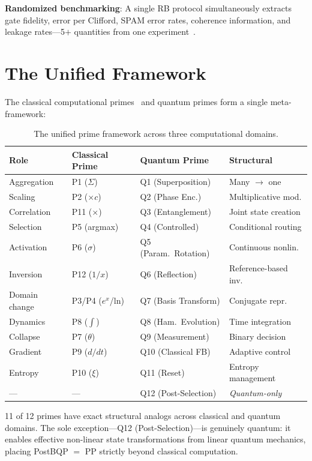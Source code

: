 \documentclass[11pt]{article}
\begin{document}
\textbf{Randomized benchmarking}: A single RB protocol simultaneously extracts gate fidelity, error per Clifford, SPAM error rates, coherence information, and leakage rates---5$+$ quantities from one experiment~\cite{rb}.

\section{The Unified Framework}
\label{sec:unified}

The classical computational primes~\cite{bieg_primes} and quantum primes form a single meta-framework:

\begin{table}[h]
\centering
\caption{The unified prime framework across three computational domains.}
\label{tab:unified}
\footnotesize
\begin{tabular}{llll}
\toprule
Role & Classical Prime & Quantum Prime & Structural \\
\midrule
Aggregation & P1 ($\Sigma$) & Q1 (Superposition) & Many $\to$ one \\
Scaling & P2 ($\times c$) & Q2 (Phase Enc.) & Multiplicative mod. \\
Correlation & P11 ($\times$) & Q3 (Entanglement) & Joint state creation \\
Selection & P5 (argmax) & Q4 (Controlled) & Conditional routing \\
Activation & P6 ($\sigma$) & Q5 (Param.\ Rotation) & Continuous nonlin. \\
Inversion & P12 ($1/x$) & Q6 (Reflection) & Reference-based inv. \\
Domain change & P3/P4 ($e^x$/ln) & Q7 (Basis Transform) & Conjugate repr. \\
Dynamics & P8 ($\int$) & Q8 (Ham.\ Evolution) & Time integration \\
Collapse & P7 ($\theta$) & Q9 (Measurement) & Binary decision \\
Gradient & P9 ($d/dt$) & Q10 (Classical FB) & Adaptive control \\
Entropy & P10 ($\xi$) & Q11 (Reset) & Entropy management \\
--- & --- & Q12 (Post-Selection) & \textit{Quantum-only} \\
\bottomrule
\end{tabular}
\end{table}

11 of 12 primes have exact structural analogs across classical and quantum domains. The sole exception---Q12 (Post-Selection)---is genuinely quantum: it enables effective non-linear state transformations from linear quantum mechanics, placing PostBQP $=$ PP strictly beyond classical computation.
\end{document}
